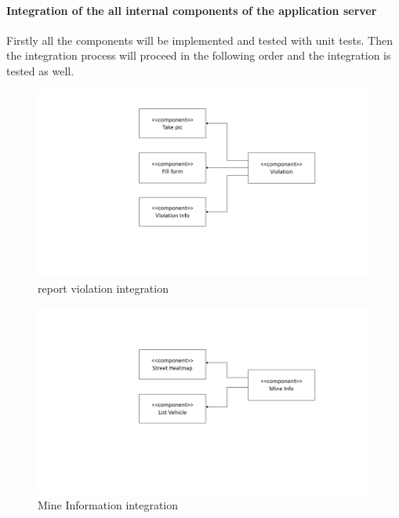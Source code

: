 \paragraph{Integration of the all internal components of the application server}
Firstly all the components will be implemented and tested with unit tests. Then the integration process will proceed in the following order and the integration is tested as well.

\begin{figure}[H]
\centering
\includegraphics[width=\textwidth]{Images/reportviolationintegration.png}
\caption{\label{fig:reportviolationintegration} report violation integration}
\end{figure}

\begin{figure}[H]
\centering
\includegraphics[width=\textwidth]{Images/MineInfoIntegration.png}
\caption{\label{fig:MineInfoIntegration} Mine Information integration}
\end{figure}
